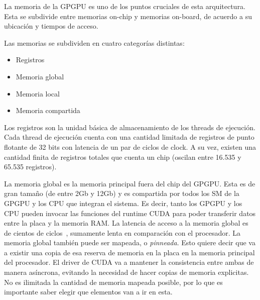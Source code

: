 %
%
La memoria de la GPGPU es uno de los puntos cruciales de esta arquitectura. Esta se subdivide
entre memorias on-chip y memorias on-board, de acuerdo a su ubicaci\'on y tiempos de acceso.

Las memorias se subdividen en cuatro categor\'ias distintas:

\begin{itemize}
  \item Registros
  \item Memoria global
  \item Memoria local
  \item Memoria compartida
\end{itemize}

Los registros son la unidad b\'asica de almacenamiento de los threads de ejecuci\'on.
Cada thread de ejecuci\'on cuenta con una cantidad limitada de registros de punto flotante de
32 bits con latencia de un par de ciclos de clock. A su vez, existen una cantidad finita de
registros totales que cuenta un chip (oscilan entre 16.535 y 65.535 registros).

La memoria global es la memoria principal fuera del chip del GPGPU. Esta es de gran tama\~no (de
entre 2Gb y 12Gb) y es compartida por todos los SM de la GPGPU y los CPU que integran el
sistema. Es decir, tanto los GPGPU y los CPU pueden invocar las funciones del runtime CUDA
para poder transferir datos entre la placa y la memoria RAM. La latencia de acceso a la memoria global
es de cientos de ciclos~\cite{Demystifying}, sumamente lenta en comparaci\'on con el procesador.
La memoria global tambi\'en puede ser mapeada, o \textit{pinneada}. Esto quiere decir que va a existir
una copia de esa reserva de memoria en la placa en la memoria principal del procesador. El driver
de CUDA va a mantener la consistencia entre ambas de manera as\'incrona, evitando la necesidad de hacer
copias de memoria explicitas. No es ilimitada la cantidad de memoria mapeada posible, por lo que
es importante saber elegir que elementos van a ir en esta.

